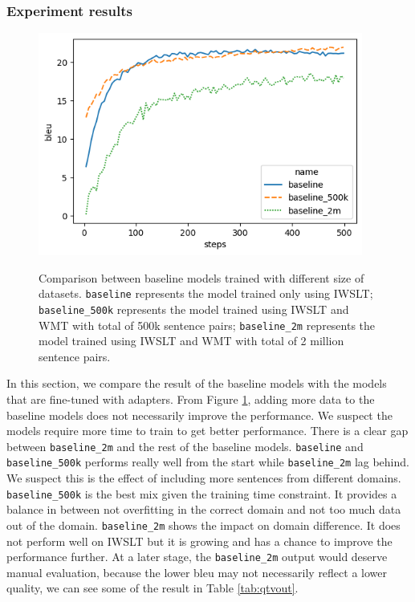 \subsubsection{Experiment results}
\begin{figure}[h]
    {\includegraphics[width=0.95\textwidth]{img/baseline.png}}
    \centering
    \caption{
        Comparison between baseline models trained with different size of datasets. \texttt{baseline} represents the model trained only using IWSLT; \texttt{baseline\_500k} represents the model trained using IWSLT and WMT with total of 500k sentence pairs; \texttt{baseline\_2m} represents the model trained using IWSLT and WMT with total of 2 million sentence pairs.}
    \label{img:basecomp}
\end{figure}

In this section, we compare the result of the baseline models with the models that are fine-tuned with adapters. From Figure \ref{img:basecomp}, adding more data to the baseline models does not necessarily improve the performance. We suspect the models require more time to train to get better performance. There is a clear gap between \texttt{baseline\_2m} and the rest of the baseline models. \texttt{baseline} and \texttt{baseline\_500k} performs really well from the start while \texttt{baseline\_2m} lag behind. We suspect this is the effect of including more sentences from different domains. \texttt{baseline\_500k} is the best mix given the training time constraint. It provides a balance in between not overfitting in the correct domain and not too much data out of the domain. \texttt{baseline\_2m} shows the impact on domain difference. It does not perform well on IWSLT but it is growing and has a chance to improve the performance further. At a later stage, the \texttt{baseline\_2m} output would deserve manual evaluation, because the lower bleu may not necessarily reflect a lower quality, we can see some of the result in Table \ref{tab:qtvout}.

